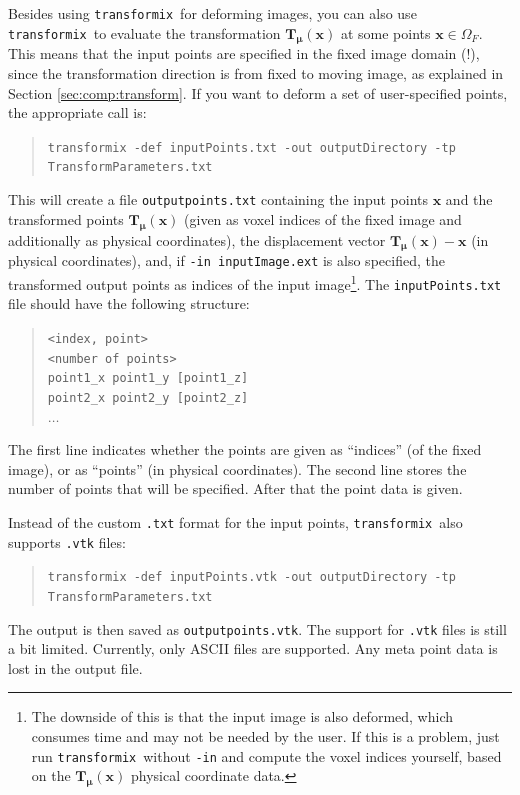 \documentclass[]{report}
\newcommand{\transformix}{\texttt{transformix}}
\newcommand{\vx}{\bm{x}}
\newcommand{\vmu}{\bm{\mu}}
\newcommand{\vTmx}{\bm{T}_{\vmu}(\bm{x})}
\begin{document}
Besides using \transformix\ for deforming images, you can also use
\transformix\ to evaluate the transformation $\vTmx$ at some points
$\vx \in \Omega_F$. This means that the input points are specified
in the fixed image domain (!), since the transformation direction is
from fixed to moving image, as explained in Section
\ref{sec:comp:transform}. If you want to deform a set of
user-specified points, the appropriate call is:
\begin{quote}
\texttt{transformix -def inputPoints.txt -out outputDirectory -tp
TransformParameters.txt}
\end{quote}
This will create a file \texttt{outputpoints.txt} containing the
input points $\vx$ and the transformed points $\vTmx$ (given as
voxel indices of the fixed image and additionally as physical
coordinates), the displacement vector $\vTmx - \vx$ (in physical
coordinates), and, if \texttt{-in inputImage.ext} is also specified,
the transformed output points as indices of the input
image\footnote{The downside of this is that the input image is also
deformed, which consumes time and may not be needed by the user. If
this is a problem, just run \transformix\ without \texttt{-in} and
compute the voxel indices yourself, based on the $\vTmx$ physical
coordinate data.}. The \texttt{inputPoints.txt} file should have the
following structure:
\begin{quote}
\texttt{<index, point>}\\
\texttt{<number of points>}\\
\texttt{point1\_x point1\_y [point1\_z]}\\
\texttt{point2\_x point2\_y [point2\_z]}\\
\texttt{$\ldots$}
\end{quote}
The first line indicates whether the points are given as
``indices'' (of the fixed image), or as ``points'' (in physical
coordinates). The second line stores the number of points that
will be specified. After that the point data is given.

Instead of the custom \texttt{.txt} format for the input points, \transformix\
also supports \texttt{.vtk} files:
\begin{quote}
\texttt{transformix -def inputPoints.vtk -out outputDirectory -tp
TransformParameters.txt}
\end{quote}
The output is then saved as \texttt{outputpoints.vtk}. The support
for \texttt{.vtk} files is still a bit limited. Currently, only
ASCII files are supported. Any meta point data is lost in the output file.
\end{document}
